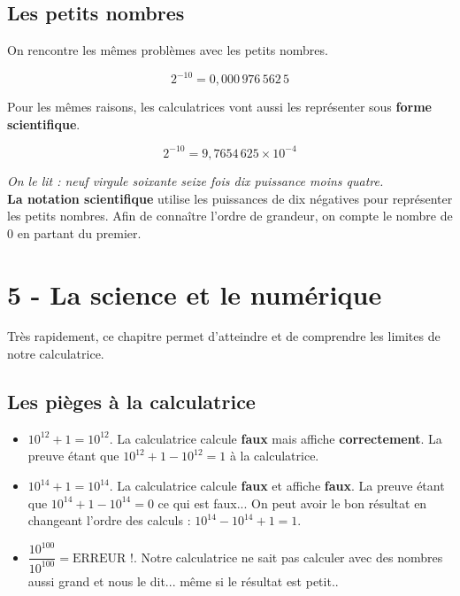 \newpage

\subsection*{Les petits nombres}

\begin{multicols}{2}

  On rencontre les mêmes problèmes avec les petits nombres.

  $$2^{-10} = 0, 000 \, 976\, 562\, 5$$

  Pour les mêmes raisons, les calculatrices vont aussi les représenter sous \textbf{forme scientifique}.

  $$2^{-10} = 9, 7654 \, 625 \times 10^{-4}$$

  \textit{On le lit : neuf virgule soixante seize fois dix puissance moins quatre.} \\
  \textbf{La notation scientifique} utilise les puissances de dix négatives pour représenter les petits nombres. Afin de connaître l'ordre de grandeur, on compte le nombre de 0 en partant du premier. \\

\end{multicols}
 

\section*{5 - La science et le numérique}

Très rapidement, ce chapitre permet d'atteindre et de comprendre les limites de notre calculatrice. \\

\subsection*{Les pièges à la calculatrice}

  \begin{itemize}[label={$\bullet$}]
  \item $10^{12} + 1 = 10^{12} $. La calculatrice calcule \textbf{faux} mais affiche \textbf{correctement}. La preuve étant que $10^{12} + 1 - 10^{12} = 1$ à la calculatrice.
  \item $10^{14} + 1 = 10^{14} $. La calculatrice calcule \textbf{faux} et affiche \textbf{faux}. La preuve étant que $10^{14} + 1 - 10^{14} = 0$ ce qui est faux... On peut avoir le bon résultat en changeant l'ordre des calculs : $10^{14} - 10^{14} +1 = 1$.
  \item $\dfrac{10^{100}}{10^{100}} = \text{ERREUR !} $. Notre calculatrice ne sait pas calculer avec des nombres aussi grand et nous le dit... même si le résultat est petit..
  \end{itemize}

